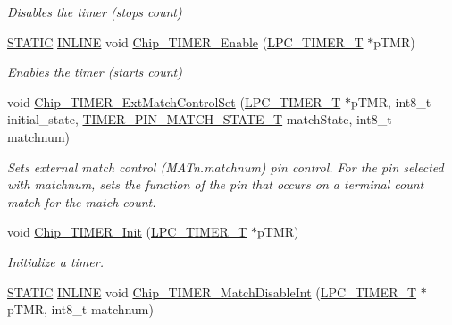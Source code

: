 \begin{DoxyCompactItemize}
\begin{DoxyCompactList}\small\item\em Disables the timer (stops count) \end{DoxyCompactList}\item 
\hyperlink{group__LPC__Types__Public__Macros_ga10b2d890d871e1489bb02b7e70d9bdfb}{S\+T\+A\+T\+IC} \hyperlink{group__LPC__Types__Public__Types_ga2eb6f9e0395b47b8d5e3eeae4fe0c116}{I\+N\+L\+I\+NE} void \hyperlink{group__TIMER__17XX__40XX_gaff500707a8a397daf29cc84f454802b2}{Chip\+\_\+\+T\+I\+M\+E\+R\+\_\+\+Enable} (\hyperlink{structLPC__TIMER__T}{L\+P\+C\+\_\+\+T\+I\+M\+E\+R\+\_\+T} $\ast$p\+T\+MR)
\begin{DoxyCompactList}\small\item\em Enables the timer (starts count) \end{DoxyCompactList}\item 
void \hyperlink{group__TIMER__17XX__40XX_gaf58d175fd6011349b7331055422b9e28}{Chip\+\_\+\+T\+I\+M\+E\+R\+\_\+\+Ext\+Match\+Control\+Set} (\hyperlink{structLPC__TIMER__T}{L\+P\+C\+\_\+\+T\+I\+M\+E\+R\+\_\+T} $\ast$p\+T\+MR, int8\+\_\+t initial\+\_\+state, \hyperlink{group__TIMER__17XX__40XX_ga15be0f559655d587ad466689f639ab72}{T\+I\+M\+E\+R\+\_\+\+P\+I\+N\+\_\+\+M\+A\+T\+C\+H\+\_\+\+S\+T\+A\+T\+E\+\_\+T} match\+State, int8\+\_\+t matchnum)
\begin{DoxyCompactList}\small\item\em Sets external match control (M\+A\+Tn.\+matchnum) pin control. For the pin selected with matchnum, sets the function of the pin that occurs on a terminal count match for the match count. \end{DoxyCompactList}\item 
void \hyperlink{group__TIMER__17XX__40XX_gac2ca0aff00ae8a651e129afba400c833}{Chip\+\_\+\+T\+I\+M\+E\+R\+\_\+\+Init} (\hyperlink{structLPC__TIMER__T}{L\+P\+C\+\_\+\+T\+I\+M\+E\+R\+\_\+T} $\ast$p\+T\+MR)
\begin{DoxyCompactList}\small\item\em Initialize a timer. \end{DoxyCompactList}\item 
\hyperlink{group__LPC__Types__Public__Macros_ga10b2d890d871e1489bb02b7e70d9bdfb}{S\+T\+A\+T\+IC} \hyperlink{group__LPC__Types__Public__Types_ga2eb6f9e0395b47b8d5e3eeae4fe0c116}{I\+N\+L\+I\+NE} void \hyperlink{group__TIMER__17XX__40XX_ga81252a6e24fddbf78d62f791f589306e}{Chip\+\_\+\+T\+I\+M\+E\+R\+\_\+\+Match\+Disable\+Int} (\hyperlink{structLPC__TIMER__T}{L\+P\+C\+\_\+\+T\+I\+M\+E\+R\+\_\+T} $\ast$p\+T\+MR, int8\+\_\+t matchnum)

\end{DoxyCompactItemize}
